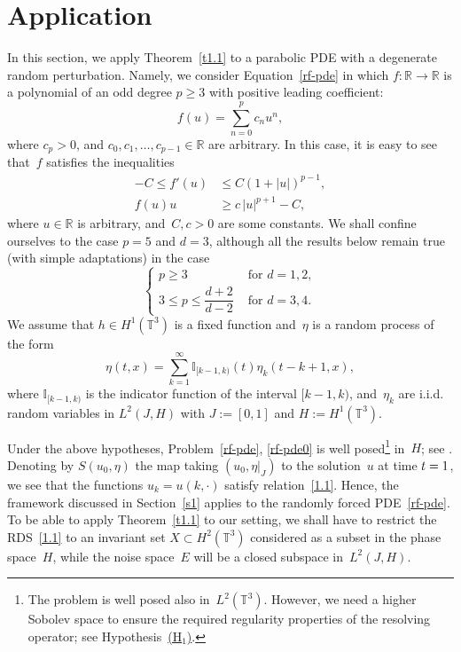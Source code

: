 \documentclass[11pt]{article}
\theoremstyle{plain}
\theoremstyle{definition}
\theoremstyle{plain}
\numberwithin{equation}{section}
\newcommand{\R}{{\mathbb R}}
\newcommand{\I}{{\mathbb I}}
\newcommand{\T}{{\mathbb T}}
\begin{document}
\section{Application}
\label{s4}
In this section, we apply Theorem~\ref{t1.1} to a parabolic PDE with a degenerate random perturbation. Namely, we consider Equation~\eqref{rf-pde} in which $f:\R\to\R$ is a polynomial of an odd degree $p\ge3$ with positive leading coefficient:
\begin{equation} \label{nonlinear-term}
f(u)=\sum_{n=0}^p c_n u^n,
\end{equation}
where $c_p>0$, and $c_0, c_1, \ldots, c_{p-1}\in \R$ are arbitrary. In this case, it is easy to see that~$f$ satisfies the inequalities
\begin{align}
-C\le f'(u)&\le C(1+|u|)^{p-1},\label{E:4.1}\\
f(u)u&\ge c\,|u|^{p+1}-C,\label{E:4.2}
\end{align}
where $u\in\R$ is arbitrary, and~$C,c>0$ are some constants. We shall confine ourselves to the case $p=5$ and $d=3$, although all the results below remain true (with simple adaptations) in the case
\begin{equation}\label{power-dimension}
\begin{cases}p\ge3 & \text{ for } d=1,2,\\ 3\le p\le\dfrac{d+2}{d-2} & \text{ for } d=3,4. \end{cases}
\end{equation}
We assume that $h\in H^1(\T^3)$ is a fixed function and~$\eta$ is a random process of the form%
\begin{equation} \label{E:4.3}
\eta(t,x)=\sum_{k=1}^\infty \I_{[k-1,k)}(t)\eta_k(t-k+1,x),
\end{equation}
where $\I_{[k-1,k)}$ is the indicator function of the interval $[k-1,k)$, and~$\eta_k$ are i.i.d. random variables in $L^2(J,H)$ with $J:=[0,1]$ and $H:=H^1(\T^3)$.

Under the above hypotheses, Problem~\eqref{rf-pde}, \eqref{rf-pde0} is well posed\footnote{The problem is well posed also in~$L^2(\T^3)$. However, we need a higher Sobolev space to ensure the required regularity properties of the resolving operator; see Hypothesis~\hyperlink{H1}{(H$_1$)}.} in~$H$; see \cite[Chap.\,I,\,\S5]{BV1992}. Denoting by $S(u_0,\eta)$ the map taking $(u_0,\eta|_J)$ to the solution~$u$ at time $t=\nobreak1$, we see that the functions $u_k=u(k,\cdot)$ satisfy relation~\eqref{1.1}. Hence, the framework discussed in Section~\ref{s1} applies to the randomly forced PDE~\eqref{rf-pde}. To be able to apply Theorem~\ref{t1.1} to our setting, we shall have to restrict the RDS~\eqref{1.1} to an invariant set $X\subset H^2(\T^3)$ considered as a subset in the phase space~$H$, while the noise space~$E$ will be a closed subspace in~$L^2(J,H)$.
\end{document}
